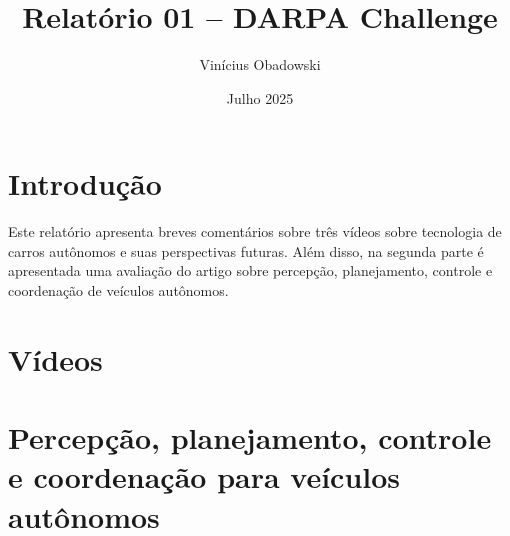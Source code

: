 \documentclass[12pt, a4paper]{article}
\title{Relatório 01 -- DARPA Challenge}
\author{Vinícius Obadowski}
\date{Julho 2025}
\begin{document}
\maketitle

\section{Introdução}

Este relatório apresenta breves comentários sobre três vídeos \cite{cleanerwatt,basicthinking,frankyoutube} sobre tecnologia de carros autônomos e suas perspectivas futuras. Além disso, na segunda parte é apresentada uma avaliação do artigo \cite{Pendleton2017Autonomous} sobre percepção, planejamento, controle e coordenação de veículos autônomos.

\section{Vídeos}



\section{Percepção, planejamento, controle e coordenação para veículos autônomos}



% 
\printbibliography
\end{document}
